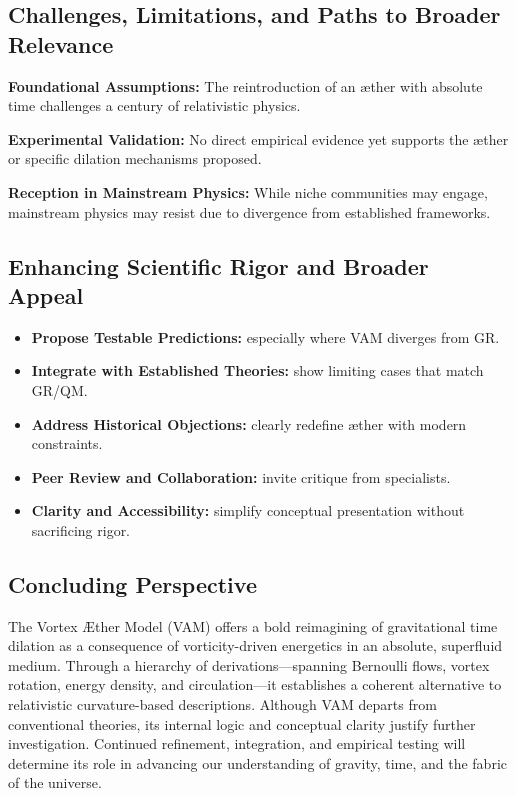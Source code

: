 \subsection{Challenges, Limitations, and Paths to Broader Relevance}

\textbf{Foundational Assumptions:} The reintroduction of an æther with absolute time challenges a century of relativistic physics.

\textbf{Experimental Validation:} No direct empirical evidence yet supports the æther or specific dilation mechanisms proposed.

\textbf{Reception in Mainstream Physics:} While niche communities may engage, mainstream physics may resist due to divergence from established frameworks.

\subsection{Enhancing Scientific Rigor and Broader Appeal}

\begin{itemize}
    \item \textbf{Propose Testable Predictions:} especially where VAM diverges from GR.
    \item \textbf{Integrate with Established Theories:} show limiting cases that match GR/QM.
    \item \textbf{Address Historical Objections:} clearly redefine æther with modern constraints.
    \item \textbf{Peer Review and Collaboration:} invite critique from specialists.
    \item \textbf{Clarity and Accessibility:} simplify conceptual presentation without sacrificing rigor.
\end{itemize}

\subsection{Concluding Perspective}

The Vortex Æther Model (VAM) offers a bold reimagining of gravitational time dilation as a consequence of vorticity-driven energetics in an absolute, superfluid medium. Through a hierarchy of derivations—spanning Bernoulli flows, vortex rotation, energy density, and circulation—it establishes a coherent alternative to relativistic curvature-based descriptions. Although VAM departs from conventional theories, its internal logic and conceptual clarity justify further investigation. Continued refinement, integration, and empirical testing will determine its role in advancing our understanding of gravity, time, and the fabric of the universe.